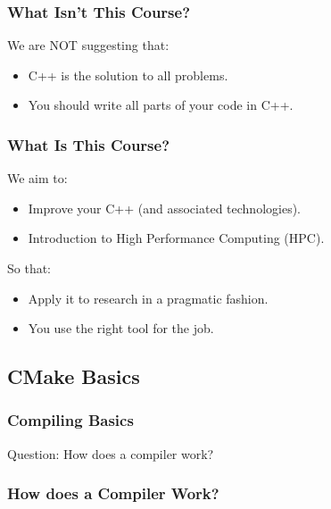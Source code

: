 \hypertarget{what-isnt-this-course}{%
\subsubsection{What Isn't This Course?}\label{what-isnt-this-course}}

We are NOT suggesting that:

\begin{itemize}
\tightlist
\item
  C++ is the solution to all problems.
\item
  You should write all parts of your code in C++.
\end{itemize}

\hypertarget{what-is-this-course}{%
\subsubsection{What Is This Course?}\label{what-is-this-course}}

We aim to:

\begin{itemize}
\tightlist
\item
  Improve your C++ (and associated technologies).
\item
  Introduction to High Performance Computing (HPC).
\end{itemize}

So that:

\begin{itemize}
\tightlist
\item
  Apply it to research in a pragmatic fashion.
\item
  You use the right tool for the job.
\end{itemize}

\hypertarget{cmake-basics}{%
\subsection{CMake Basics}\label{cmake-basics}}

\hypertarget{compiling-basics}{%
\subsubsection{Compiling Basics}\label{compiling-basics}}

Question: How does a compiler work?

\hypertarget{how-does-a-compiler-work}{%
\subsubsection{How does a Compiler
Work?}\label{how-does-a-compiler-work}}

